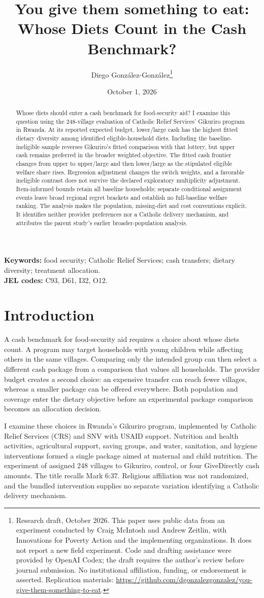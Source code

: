 \documentclass[11pt]{article}
\title{You give them something to eat:\\Whose Diets Count in the Cash Benchmark?}
\author{Diego Gonz\'alez-Gonz\'alez\thanks{Research draft, October 2026. This paper uses public data from an experiment conducted by Craig McIntosh and Andrew Zeitlin, with Innovations for Poverty Action and the implementing organizations. It does not report a new field experiment. Code and drafting assistance were provided by OpenAI Codex; the draft requires the author's review before journal submission. No institutional affiliation, funding, or endorsement is asserted. Replication materials: \url{https://github.com/dgonzalezgonzalez/you-give-them-something-to-eat}.}}
\date{October 1, 2026}
\begin{document}
\maketitle
\begin{abstract}
\noindent Whose diets should enter a cash benchmark for food-security aid? I examine this question using the 248-village evaluation of Catholic Relief Services' Gikuriro program in Rwanda. At its reported expected budget, lower/large cash has the highest fitted dietary diversity among identified eligible-household diets. Including the baseline-ineligible sample reverses Gikuriro's fitted comparison with that lottery, but upper cash remains preferred in the broader weighted objective. The fitted cash frontier changes from upper to upper/large and then lower/large as the stipulated eligible welfare share rises. Regression adjustment changes the switch weights, and a favorable ineligible contrast does not survive the declared exploratory multiplicity adjustment. Item-informed bounds retain all baseline households; separate conditional assignment events leave broad regional regret brackets and establish no full-baseline welfare ranking. The analysis makes the population, missing-diet and cost conventions explicit. It identifies neither provider preferences nor a Catholic delivery mechanism, and attributes the parent study's earlier broader-population analysis.
\end{abstract}
\noindent\textbf{Keywords:} food security; Catholic Relief Services; cash transfers; dietary diversity; treatment allocation.\\
\textbf{JEL codes:} C93, D61, I32, O12.
\newpage

\section{Introduction}

A cash benchmark for food-security aid requires a choice about whose diets count. A program may target households with young children while affecting others in the same villages. Comparing only the intended group can then select a different cash package from a comparison that values all households. The provider budget creates a second choice: an expensive transfer can reach fewer villages, whereas a smaller package can be offered everywhere. Both population and coverage enter the dietary objective before an experimental package comparison becomes an allocation decision.

I examine these choices in Rwanda's Gikuriro program, implemented by Catholic Relief Services (CRS) and SNV with USAID support. Nutrition and health activities, agricultural support, saving groups, and water, sanitation, and hygiene interventions formed a single package aimed at maternal and child nutrition. The experiment of \citet{mcintosh2024} assigned 248 villages to Gikuriro, control, or four GiveDirectly cash amounts. The title recalls Mark 6:37. Religious affiliation was not randomized, and the bundled intervention supplies no separate variation identifying a Catholic delivery mechanism.
\end{document}
